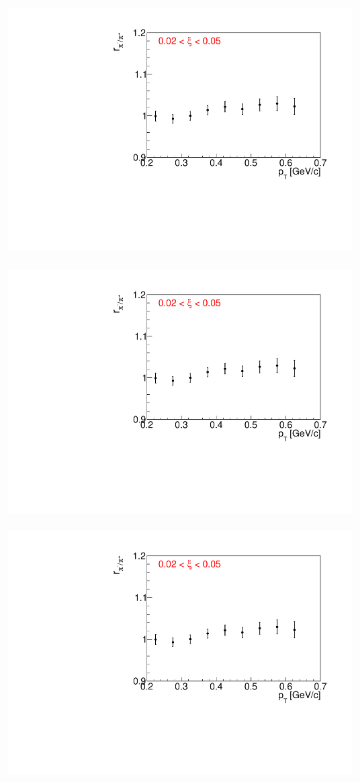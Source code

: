 \begin{figure}[h!]
\begin{subfigure}{.32\textwidth}
		\includegraphics[width=\linewidth, page=5]{chapters/chrgSTAR/img/dEdx/fit2019_fitResult_0_0_step_0.pdf}
	\end{subfigure}
	\begin{subfigure}{.32\textwidth}
		\includegraphics[width=\linewidth, page=6]{chapters/chrgSTAR/img/dEdx/fit2019_fitResult_0_0_step_0.pdf}
	\end{subfigure}
	\begin{subfigure}{.32\textwidth}
		\includegraphics[width=\linewidth, page=7]{chapters/chrgSTAR/img/dEdx/fit2019_fitResult_0_0_step_0.pdf}

\end{subfigure}
\end{figure}
